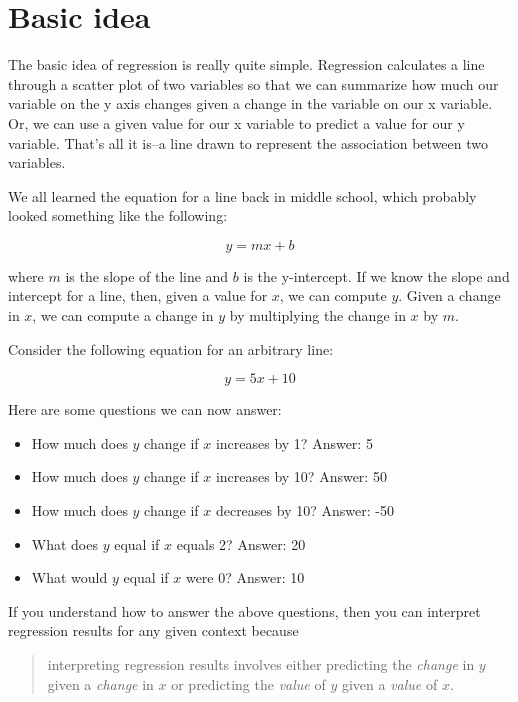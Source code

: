 \documentclass[
]{book}
\providecommand{\tightlist}{%
  \setlength{\itemsep}{0pt}\setlength{\parskip}{0pt}}
\begin{document}
\hypertarget{basic-idea}{%
\section{Basic idea}\label{basic-idea}}

The basic idea of regression is really quite simple. Regression calculates a line through a scatter plot of two variables so that we can summarize how much our variable on the y axis changes given a change in the variable on our x variable. Or, we can use a given value for our x variable to predict a value for our y variable. That's all it is--a line drawn to represent the association between two variables.

We all learned the equation for a line back in middle school, which probably looked something like the following:

\begin{equation}
y = mx + b
\label{eq:line}
\end{equation}

where \(m\) is the slope of the line and \(b\) is the y-intercept. If we know the slope and intercept for a line, then, given a value for \(x\), we can compute \(y\). Given a change in \(x\), we can compute a change in \(y\) by multiplying the change in \(x\) by \(m\).

Consider the following equation for an arbitrary line:

\[y = 5x + 10\]

Here are some questions we can now answer:

\begin{itemize}
\tightlist
\item
  How much does \(y\) change if \(x\) increases by 1? Answer: 5
\item
  How much does \(y\) change if \(x\) increases by 10? Answer: 50
\item
  How much does \(y\) change if \(x\) decreases by 10? Answer: -50
\item
  What does \(y\) equal if \(x\) equals 2? Answer: 20
\item
  What would \(y\) equal if \(x\) were 0? Answer: 10
\end{itemize}

If you understand how to answer the above questions, then you can interpret regression results for any given context because

\begin{quote}
interpreting regression results involves either predicting the \emph{change} in \(y\) given a \emph{change} in \(x\) or predicting the \emph{value} of \(y\) given a \emph{value} of \(x\).
\end{quote}
\end{document}
